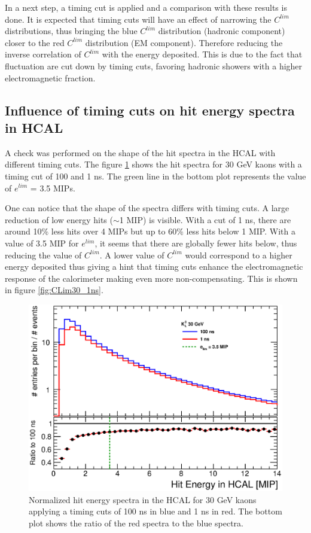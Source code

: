 In a next step, a timing cut is applied and a comparison with these results is done. It is expected that timing cuts will have an effect of narrowing the $C^{lim}$ distributions, thus bringing the blue $C^{lim}$ distribution (hadronic component) closer to the red $C^{lim}$ distribution (EM component). Therefore reducing the inverse correlation of $C^{lim}$ with the energy deposited. This is due to the fact that fluctuation are cut down by timing cuts, favoring hadronic showers with a higher electromagnetic fraction.

\subsection{Influence of timing cuts on hit energy spectra in HCAL}

A check was performed on the shape of the hit spectra in the HCAL with different timing cuts. The figure \ref{fig:HitSpectra30_timingcuts} shows the hit spectra for 30 GeV kaons with a timing cut of 100 and 1 ns. The green line in the bottom plot represents the value of $e^{lim}$ = 3.5 MIPs.

One can notice that the shape of the spectra differs with timing cuts. A large reduction of low energy hits ($\sim$1 MIP) is visible. With a cut of 1 ns, there are around 10\% less hits over 4 MIPs but up to 60\% less hits below 1 MIP. With a value of 3.5 MIP for $e^{lim}$, it seems that there are globally fewer hits below, thus reducing the value of $C^{lim}$. A lower value of $C^{lim}$ would correspond to a higher energy deposited thus giving a hint that timing cuts enhance the electromagnetic response of the calorimeter making even more non-compensating. This is shown in figure \ref{fig:CLim30_1ns}.

\begin{figure}[htbp!]
  \centering
  \includegraphics[width=0.6\linewidth]{../Thesis_Plots/ILD/AdditionalPlots/Plots/HitEnergySpectra_Comparison_30GeV.eps}
  \caption{Normalized hit energy spectra in the HCAL for 30 GeV kaons applying a timing cuts of 100 ns in blue and 1 ns in red. The bottom plot shows the ratio of the red spectra to the blue spectra.} \label{fig:HitSpectra30_timingcuts}
\end{figure}


